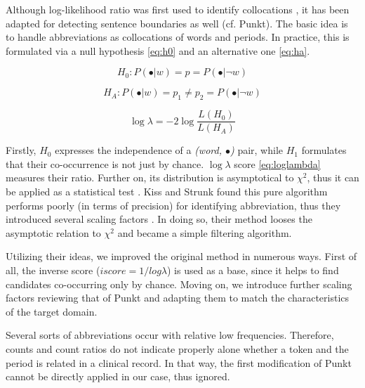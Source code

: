 Although log-likelihood ratio was first used to identify collocations \cite{dunning1993accurate}, it has been adapted for detecting sentence boundaries as well (cf. Punkt\cite{kiss2006unsupervised}). 
The basic idea is to handle abbreviations as collocations of words and periods. 
In practice, this is formulated via a null hypothesis \eqref{eq:h0} and an alternative one \eqref{eq:ha}. 

\begin{equation} \label{eq:h0}
H_0: P(\bullet|w) = p = P(\bullet|\neg w)
\end{equation}

\begin{equation} \label{eq:ha}
H_A: P(\bullet|w) = p_1 \neq p_2 = P(\bullet|\neg w) 
\end{equation}

\begin{equation} \label{eq:loglambda}
\log \lambda = -2 \log \frac{L(H_0)}{L(H_A)}
\end{equation}


Firstly, $H_0$ expresses the independence of a \emph{(word, $\bullet$)} pair, while $H_1$ formulates that their co-occurrence is not just by chance. 
$\log \lambda$ score \eqref{eq:loglambda} measures their ratio. 
Further on, its distribution is asymptotical to $\chi^2$, thus  it can be applied as a statistical test \cite{dunning1993accurate}. 
Kiss and Strunk found this pure algorithm performs poorly (in terms of precision) for identifying abbreviation, thus they introduced several scaling factors \cite{kiss2006unsupervised}. 
In doing so, their method looses the asymptotic relation to $\chi^2$ and became a simple filtering algorithm.

Utilizing their ideas, we improved the original method in numerous ways. 
First of all, the inverse score ($iscore=1/log\lambda$) is used as a base, since it helps to find candidates co-occurring only by chance. 
Moving on, we introduce further scaling factors reviewing that of Punkt and adapting them to match the characteristics of the target domain.

Several sorts of abbreviations occur with relative low frequencies. Therefore, counts and count ratios do not indicate properly alone whether a token and the period is related in a clinical record. 
In that way, the first modification of Punkt \cite{kiss2006unsupervised} cannot be directly applied in our case, thus ignored. 

